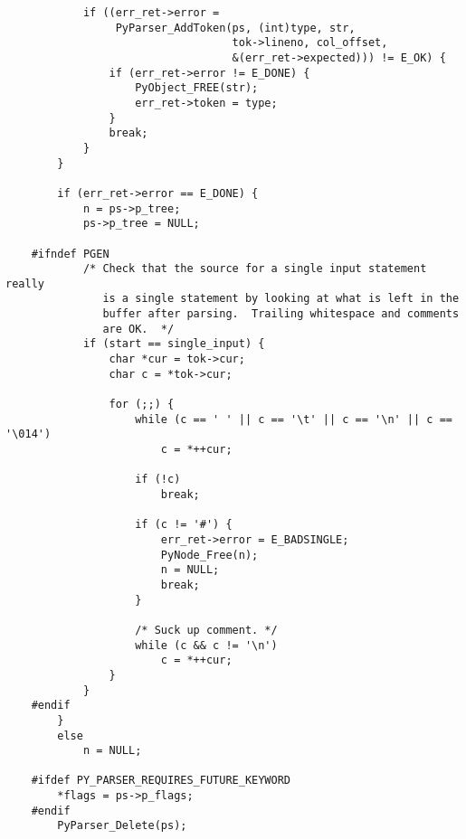 \documentclass[UTF8]{book}
\begin{document}
\begin{lstlisting}
            if ((err_ret->error =
                 PyParser_AddToken(ps, (int)type, str,
                                   tok->lineno, col_offset,
                                   &(err_ret->expected))) != E_OK) {
                if (err_ret->error != E_DONE) {
                    PyObject_FREE(str);
                    err_ret->token = type;
                }
                break;
            }
        }
    
        if (err_ret->error == E_DONE) {
            n = ps->p_tree;
            ps->p_tree = NULL;
    
    #ifndef PGEN
            /* Check that the source for a single input statement really
               is a single statement by looking at what is left in the
               buffer after parsing.  Trailing whitespace and comments
               are OK.  */
            if (start == single_input) {
                char *cur = tok->cur;
                char c = *tok->cur;
    
                for (;;) {
                    while (c == ' ' || c == '\t' || c == '\n' || c == '\014')
                        c = *++cur;
    
                    if (!c)
                        break;
    
                    if (c != '#') {
                        err_ret->error = E_BADSINGLE;
                        PyNode_Free(n);
                        n = NULL;
                        break;
                    }
    
                    /* Suck up comment. */
                    while (c && c != '\n')
                        c = *++cur;
                }
            }
    #endif
        }
        else
            n = NULL;
    
    #ifdef PY_PARSER_REQUIRES_FUTURE_KEYWORD
        *flags = ps->p_flags;
    #endif
        PyParser_Delete(ps);
    

\end{lstlisting}
\end{document}

